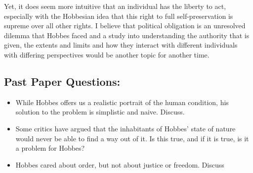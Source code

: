 \documentclass[12pt, letterpaper]{article}
\begin{document}
Yet, it does seem more intuitive that an individual has the liberty to act, especially with the Hobbesian idea that this right to full self-preservation is supreme over all other rights. I believe that political obligation is an unresolved dilemma that Hobbes faced and a study into understanding the authority that is given, the extents and limits and how they interact with different individuals with differing perspectives would be another topic for another time.


\subsection{Past Paper Questions:}
\begin{itemize}
	\item While Hobbes offers us a realistic portrait of the human condition, his solution to the problem is simplistic and naive. Discuss.
	\item Some critics have argued that the inhabitants of Hobbes' state of nature would never be able to find a way out of it. Is this true, and if it is true, is it a problem for Hobbes?
	\item Hobbes cared about order, but not about justice or freedom. Discuss
\end{itemize}
\end{document}
